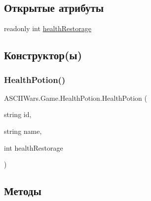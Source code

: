 \subsection*{Открытые атрибуты}
\begin{DoxyCompactItemize}
\item 
readonly int \hyperlink{class_a_s_c_i_i_wars_1_1_game_1_1_health_potion_aa337067f250678b0825d86fc3e2868c5}{health\+Restorage}
\end{DoxyCompactItemize}


\subsection{Конструктор(ы)}
\hypertarget{class_a_s_c_i_i_wars_1_1_game_1_1_health_potion_a8f1763067ff0af22657b7447fe96cc66}{}\label{class_a_s_c_i_i_wars_1_1_game_1_1_health_potion_a8f1763067ff0af22657b7447fe96cc66} 
\subsubsection{\texorpdfstring{Health\+Potion()}{HealthPotion()}}
{\footnotesize\ttfamily A\+S\+C\+I\+I\+Wars.\+Game.\+Health\+Potion.\+Health\+Potion (\begin{DoxyParamCaption}\item[{string}]{id,  }\item[{string}]{name,  }\item[{int}]{health\+Restorage }\end{DoxyParamCaption})\hspace{0.3cm}{\ttfamily [inline]}}



\subsection{Методы}
\hypertarget{class_a_s_c_i_i_wars_1_1_game_1_1_health_potion_a84ed6d197746ebb5a33a61b2b2e46fb9}{}\label{class_a_s_c_i_i_wars_1_1_game_1_1_health_potion_a84ed6d197746ebb5a33a61b2b2e46fb9} 
